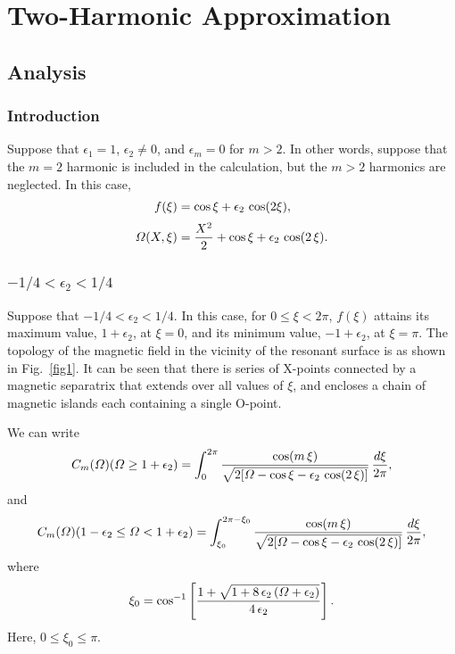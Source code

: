 \documentclass[12pt,prb,aps]{revtex4-1}
\begin{document}
\section{Two-Harmonic Approximation}
\subsection{Analysis}
\subsubsection{Introduction}
Suppose that $\epsilon_1=1$, $\epsilon_2\neq 0$,  and $\epsilon_m=0$ for $m>2$. In other words, suppose that the $m=2$ harmonic
is included in the calculation, but the $m>2$ harmonics are neglected. In this case,
\begin{align}
f(\xi) &= \cos\xi + \epsilon_2\,\cos(2\xi),\label{e71a}\\[0.5ex]
{\mit\Omega}(X,\xi) &= \frac{X^2}{2}+\cos\xi + \epsilon_2\,\cos(2\,\xi).
\end{align}

\subsubsection{$-1/4 < \epsilon_2 < 1/4$}
Suppose that $-1/4<\epsilon_2< 1/4$. In this case, for $0\leq \xi< 2\pi$, $f(\xi)$ attains its maximum value, $1+\epsilon_2$, at $\xi=0$, and its minimum value, $-1+\epsilon_2$, at $\xi=\pi$.  The topology of the magnetic field 
in the vicinity of the resonant surface is as shown in Fig.~\ref{fig1}. It can be seen that there is series of X-points connected by a
magnetic separatrix that extends over all values of $\xi$, and encloses a chain of magnetic islands each containing a
single O-point. 

We can write 
\begin{equation}
C_m({\mit\Omega})({\mit\Omega}\geq 1+\epsilon_2) = \int_0^{2\pi}
\frac{\cos(m\,\xi)}{\sqrt{2[{\mit\Omega}-\cos\xi-\epsilon_2\,\cos(2\,\xi)]}}\,\frac{d\xi}{2\pi},
\end{equation} 
and
\begin{equation}
C_m({\mit\Omega})(1-\epsilon_2\leq {\mit\Omega}< 1+\epsilon_2) = \int_{\xi_0}^{2\pi-\xi_0}
\frac{\cos(m\,\xi)}{\sqrt{2[{\mit\Omega}-\cos\xi-\epsilon_2\,\cos(2\,\xi)]}}\,\frac{d\xi}{2\pi},
\end{equation} 
where
\begin{equation}\label{xi0}
\xi_0 =\cos^{-1}\left[\frac{1+\sqrt{1+8\,\epsilon_2\,({\mit\Omega}+\epsilon_2)}}{4\,\epsilon_2}\right].
\end{equation}
Here, $0\leq \xi_0\leq \pi$. 
\end{document}
